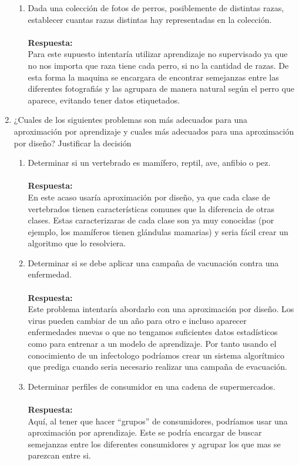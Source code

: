\documentclass[12pt,a4paper]{article}
\begin{document}
\begin{enumerate}
\begin{enumerate}
		\item Dada una colección de fotos de perros, posiblemente de distintas razas, establecer cuantas razas distintas hay representadas en la colección.\\\\		\textbf{Respuesta:}\\
		Para este supuesto intentaría utilizar aprendizaje no supervisado ya que no nos importa  que raza tiene cada perro, si no la cantidad de razas. De esta forma la maquina se encargara de encontrar semejanzas entre las diferentes fotografiás y las agrupara de manera natural según el perro que aparece, evitando tener datos etiquetados.
	\end{enumerate}


	\item ¿Cuales de los siguientes problemas son más adecuados para una aproximación por aprendizaje y cuales más adecuados para una aproximación por diseño? Justificar la decisión
	\begin{enumerate}
		\item Determinar si un vertebrado es mamífero, reptil, ave, anfibio o pez.\\\\		\textbf{Respuesta:}\\
		En este acaso usaría aproximación por diseño, ya que cada clase de vertebrados tienen características comunes que la diferencia de otras clases. Estas caracterizaras de cada clase son ya muy conocidas (por ejemplo, los mamíferos tienen glándulas mamarias) y seria fácil crear un algoritmo que lo resolviera.
		\item Determinar si se debe aplicar una campaña de vacunación contra una enfermedad.\\\\		\textbf{Respuesta:}\\
		Este problema intentaría abordarlo con una aproximación por diseño. Los virus pueden cambiar de un año para otro e incluso aparecer enfermedades nuevas o que no tengamos suficientes datos estadísticos como para entrenar a un modelo de aprendizaje. Por tanto usando el conocimiento de un infectologo podríamos crear un sistema algorítmico que prediga cuando seria necesario realizar  una campaña de evacuación. 
		\item Determinar perfiles de consumidor en una cadena de supermercados.\\\\		\textbf{Respuesta:}\\
		Aquí, al tener que hacer ``grupos'' de consumidores, podríamos usar una aproximación por aprendizaje. Este se podría encargar de buscar semejanzas entre los diferentes consumidores y agrupar los que mas se parezcan entre si.

\end{enumerate}
\end{enumerate}
\end{document}
